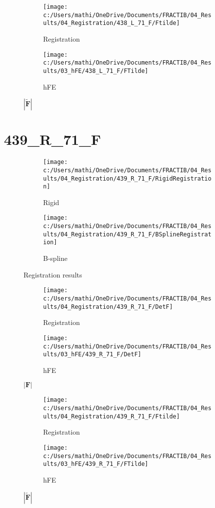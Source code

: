 \documentclass{article}%
\begin{document}
\begin{figure}[h!]%
\begin{subfigure}[b]{0.5\linewidth}%
\texttt{[image: c:/Users/mathi/OneDrive/Documents/FRACTIB/04\_Results/04\_Registration/438\_L\_71\_F/Ftilde]}%
\caption{Registration}%
\end{subfigure}%
\begin{subfigure}[b]{0.5\linewidth}%
\texttt{[image: c:/Users/mathi/OneDrive/Documents/FRACTIB/04\_Results/03\_hFE/438\_L\_71\_F/FTilde]}%
\caption{hFE}%
\end{subfigure}%
\caption{$|\widetilde{\mathbf{F}}|$}%
\end{figure}

%
\newpage%
\section*{439\_R\_71\_F}%
\label{sec:439R71F}%


\begin{figure}[h!]%
\begin{subfigure}[b]{0.5\linewidth}%
\texttt{[image: c:/Users/mathi/OneDrive/Documents/FRACTIB/04\_Results/04\_Registration/439\_R\_71\_F/RigidRegistration]}%
\caption{Rigid}%
\end{subfigure}%
\begin{subfigure}[b]{0.5\linewidth}%
\texttt{[image: c:/Users/mathi/OneDrive/Documents/FRACTIB/04\_Results/04\_Registration/439\_R\_71\_F/BSplineRegistration]}%
\caption{B{-}spline}%
\end{subfigure}%
\caption{Registration results}%
\end{figure}

%


\begin{figure}[h!]%
\begin{subfigure}[b]{0.5\linewidth}%
\texttt{[image: c:/Users/mathi/OneDrive/Documents/FRACTIB/04\_Results/04\_Registration/439\_R\_71\_F/DetF]}%
\caption{Registration}%
\end{subfigure}%
\begin{subfigure}[b]{0.5\linewidth}%
\texttt{[image: c:/Users/mathi/OneDrive/Documents/FRACTIB/04\_Results/03\_hFE/439\_R\_71\_F/DetF]}%
\caption{hFE}%
\end{subfigure}%
\caption{$|\mathbf{F}|$}%
\end{figure}

%


\begin{figure}[h!]%
\begin{subfigure}[b]{0.5\linewidth}%
\texttt{[image: c:/Users/mathi/OneDrive/Documents/FRACTIB/04\_Results/04\_Registration/439\_R\_71\_F/Ftilde]}%
\caption{Registration}%
\end{subfigure}%
\begin{subfigure}[b]{0.5\linewidth}%
\texttt{[image: c:/Users/mathi/OneDrive/Documents/FRACTIB/04\_Results/03\_hFE/439\_R\_71\_F/FTilde]}%
\caption{hFE}%
\end{subfigure}%
\caption{$|\widetilde{\mathbf{F}}|$}%
\end{figure}
\end{document}
